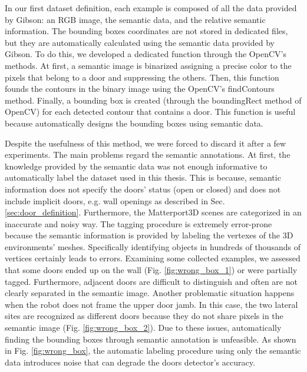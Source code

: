 In our first dataset definition, each example is composed of all the data provided by Gibson: an RGB image, the semantic data, and the relative semantic information. The bounding boxes coordinates are not stored in dedicated files, but they are automatically calculated using  the semantic data provided by Gibson. To do this, we developed a dedicated function through the OpenCV's methods. At first, a semantic image is binarized assigning a precise color to the pixels that belong to a door and suppressing the others. Then, this function founds the contours in the binary image using the OpenCV's \textsf{findContours} method. Finally, a bounding box is created (through the \textsf{boundingRect} method of OpenCV) for each detected contour that contains a door. This function is useful because automatically designs the bounding boxes using semantic data.

Despite the usefulness of this method, we were forced to discard it after a few experiments. The main problems regard the semantic annotations. At first,  the knowledge provided by the semantic data was not enough informative to automatically label the dataset used in this thesis. This is because, semantic information does not specify the doors' status (open or closed) and does not include implicit doors, e.g. wall openings as described in Sec. \ref{sec:door_definition}. Furthermore, the Matterport3D scenes are categorized in an inaccurate and noisy way. The tagging procedure is extremely error-prone because the semantic information is provided by labeling the vertexes of the 3D environments' meshes. Specifically identifying objects in hundreds of thousands of vertices certainly leads to errors. Examining some collected examples, we assessed that some doors ended up on the wall (Fig. \ref{fig:wrong_box_1}) or were partially tagged. Furthermore, adjacent doors are difficult to distinguish and often are not clearly separated in the semantic image. Another problematic situation happens when the robot does not frame the upper door jamb. In this case, the two lateral sites are recognized as different doors because they do not share pixels in the semantic image (Fig. \ref{fig:wrong_box_2}). Due to these issues, automatically finding the bounding boxes through semantic annotation is unfeasible. As shown in Fig. \ref{fig:wrong_box}, the automatic labeling procedure using only the semantic data introduces noise that can degrade the doors detector's accuracy.

